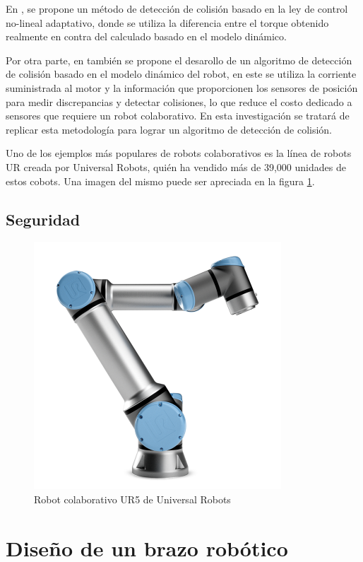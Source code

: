 En \cite{Matsumotoa}, se propone un método de detección de colisión basado en la ley de control no-lineal adaptativo, donde se utiliza la diferencia entre el torque obtenido realmente en contra del calculado basado en el modelo dinámico.

Por otra parte, en \cite{Chen2018} también se propone el desarollo de un algoritmo de detección de colisión basado en el modelo dinámico del robot, en este se utiliza la corriente suministrada al motor y la información que proporcionen los sensores de posición para medir discrepancias y detectar colisiones, lo que reduce el costo dedicado a sensores que requiere un robot colaborativo. En esta investigación se tratará de replicar esta metodología para lograr un algoritmo de detección de colisión.

Uno de los ejemplos más populares de robots colaborativos es la línea de robots UR creada por Universal Robots, quién ha vendido más de 39,000 unidades de estos cobots. Una imagen del mismo puede ser apreciada en la figura \ref{fig:ur5}.


\subsection{Seguridad}

\begin{figure}
    \centering
    \includegraphics[scale=0.5]{./img/chapter2/ur5.png}
    \caption{Robot colaborativo UR5 de Universal Robots}
    \label{fig:ur5}
\end{figure}

\section{Diseño de un brazo robótico}
